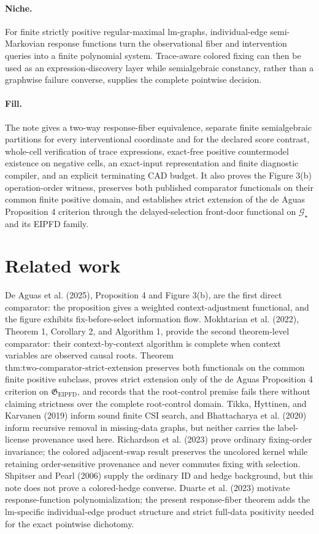 \documentclass{article}
\begin{document}
\paragraph{Niche.} For finite strictly positive regular-maximal lm-graphs, individual-edge semi-Markovian response functions turn the observational fiber and intervention queries into a finite polynomial system. Trace-aware colored fixing can then be used as an expression-discovery layer while semialgebraic constancy, rather than a graphwise failure converse, supplies the complete pointwise decision.

\paragraph{Fill.} The note gives a two-way response-fiber equivalence, separate finite semialgebraic partitions for every interventional coordinate and for the declared score contrast, whole-cell verification of trace expressions, exact-free positive countermodel existence on negative cells, an exact-input representation and finite diagnostic compiler, and an explicit terminating CAD budget. It also proves the Figure 3(b) operation-order witness, preserves both published comparator functionals on their common finite positive domain, and establishes strict extension of the de Aguas Proposition 4 criterion through the delayed-selection front-door functional on \(\mathcal G_\star\) and its EIPFD family.

\section{Related work}

De Aguas et al. (2025), Proposition 4 and Figure 3(b), are the first direct comparator: the proposition gives a weighted context-adjustment functional, and the figure exhibits fix-before-select information flow. Mokhtarian et al. (2022), Theorem 1, Corollary 2, and Algorithm 1, provide the second theorem-level comparator: their context-by-context algorithm is complete when context variables are observed causal roots. Theorem \(\text{thm:two-comparator-strict-extension}\) preserves both functionals on the common finite positive subclass, proves strict extension only of the de Aguas Proposition 4 criterion on \(\mathfrak G_{\mathrm{EIPFD}}\), and records that the root-control premise fails there without claiming strictness over the complete root-control domain. Tikka, Hyttinen, and Karvanen (2019) inform sound finite CSI search, and Bhattacharya et al. (2020) inform recursive removal in missing-data graphs, but neither carries the label-license provenance used here. Richardson et al. (2023) prove ordinary fixing-order invariance; the colored adjacent-swap result preserves the uncolored kernel while retaining order-sensitive provenance and never commutes fixing with selection. Shpitser and Pearl (2006) supply the ordinary ID and hedge background, but this note does not prove a colored-hedge converse. Duarte et al. (2023) motivate response-function polynomialization; the present response-fiber theorem adds the lm-specific individual-edge product structure and strict full-data positivity needed for the exact pointwise dichotomy.
\end{document}
